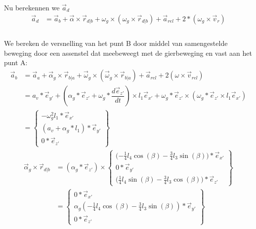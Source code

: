\documentclass[a4paper,10pt]{article}
\begin{document}
Nu berekennen we $\vec{a}_d$\\
\begin{equation}
	\begin{aligned}
		\vec{a}_d &= \vec{a}_b + \vec{\alpha} \times  \vec{r}_{d|b} + \omega_g \times (\omega_g \times \vec{r}_{d|b}) + \vec{a}_{rel} + 2* (\omega_g \times \vec{v}_r)\\
	\end{aligned}
\end{equation}
\\
We bereken de versnelling van het punt B door middel van samengestelde beweging door een assenstel dat meebeweegt met de gierbeweging en vast aan het punt A: \\
\begin{equation}
\begin{aligned}
\vec{a}_b &= \vec{a}_a + \vec{\alpha}_g  \times \vec{r}_{b|a} + \vec{\omega}_g \times (\vec{\omega}_g \times \vec{r}_{b|a}) + \vec{a}_{rel} + 2(\omega \times \vec{v}_{rel})\\
&= a_v * \vec{e}_{y'} + (\alpha_g * \vec{e}_{z'} + \omega_g *\dfrac{d\vec{e}_{z'}}{dt}) \times l_1 \vec{e}_{x'} + \omega_{g} *\vec{e}_{z'} \times (\omega_{g} *\vec{e}_{z'}  \times l_1 \vec{e}_{x'})\\
& = \begin{Bmatrix}
-\omega^{2}_g l_1 * \vec{e}_{x'}\\
(a_v + \alpha_g * l_1)*\vec{e}_{y'}\\
0 * \vec{e}_{z'}
\end{Bmatrix}
\end{aligned}
\end{equation}
\begin{equation}
\begin{aligned}
	\vec{\alpha}_g \times \vec{r}_{d|b}  &= (\alpha_g * \vec{e}_{z'}) \times \begin{Bmatrix}
	\Big({-\frac{1}{4}} l_4 \cos(\beta)-\frac{3}{4} l_3 \sin(\beta)\Big)*\vec{e}_{x'}\\
	0 * \vec{e}_{y'}\\
	\Big (\frac{1}{4} l_4 \sin(\beta) - \frac{3}{4} l_3 \cos(\beta)\Big) * \vec{e}_{z'}
	\end{Bmatrix}\\
	&= \begin{Bmatrix}
	0*\vec{e}_{x'}\\
	\alpha_g ({-\frac{1}{4}} l_4 \cos(\beta)-\frac{3}{4} l_3 \sin(\beta))*\vec{e}_{y'}\\
	0*\vec{e}_{z'}
	\end{Bmatrix}
\end{aligned}
\end{equation}
\end{document}
